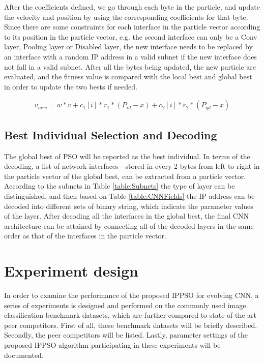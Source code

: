 \documentclass[conference]{IEEEtran}
\begin{document}
After the coefficients defined, we go through each byte in the particle, and update the velocity and position by using the corresponding coefficients for that byte. Since there are some constraints for each interface in the particle vector according to its position in the particle vector, e.g. the second interface can only be a Conv layer, Pooling layer or Disabled layer, the new interface needs to be replaced by an interface with a random IP address in a valid subnet if the new interface does not fall in a valid subnet. After all the bytes being updated, the new particle are evaluated, and the fitness value is compared with the local best and global best in order to update the two bests if needed.

\begin{equation}\label{eq:UpdateVNew}
\begin{aligned}
v_{new} = w * v + c_{1}[i] * r_{1} * (P_{id} - x) + c_{2}[i] * r_{2} * (P_{gd} - x)
\end{aligned}
\end{equation}


\subsection{Best Individual Selection and Decoding}

The global best of PSO will be reported as the best individual. In terms of the decoding, a list of network interfaces - stored in every 2 bytes from left to right in the particle vector of the global best, can be extracted from a particle vector. According to the subnets in Table \ref{table:Subnets} the type of layer can be distinguished, and then based on Table \ref{table:CNNFields} the IP address can be decoded into different sets of binary string, which indicate the parameter values of the layer. After decoding all the interfaces in the global best, the final CNN architecture can be attained by connecting all of the decoded layers in the same order as that of the interfaces in the particle vector.

\section{Experiment design}\label{sec:EPDesign}

In order to examine the performance of the proposed IPPSO for evolving CNN, a series of experiments is designed and performed on the commonly used image classification benchmark datasets, which are further compared to state-of-the-art peer competitors. First of all, these benchmark datasets will be briefly described. Secondly, the peer competitors will be listed. Lastly, parameter settings of the proposed IPPSO algorithm participating in these experiments will be documented.
\end{document}
